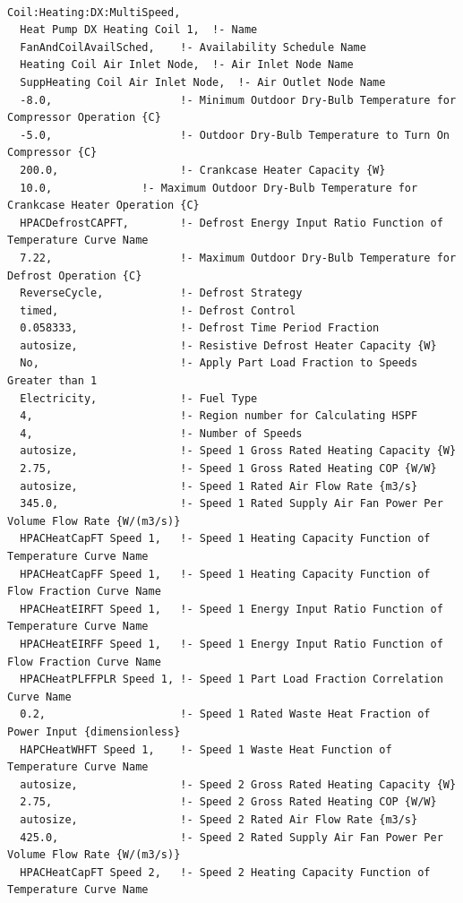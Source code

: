 \begin{lstlisting}

Coil:Heating:DX:MultiSpeed,
  Heat Pump DX Heating Coil 1,  !- Name
  FanAndCoilAvailSched,    !- Availability Schedule Name
  Heating Coil Air Inlet Node,  !- Air Inlet Node Name
  SuppHeating Coil Air Inlet Node,  !- Air Outlet Node Name
  -8.0,                    !- Minimum Outdoor Dry-Bulb Temperature for Compressor Operation {C}
  -5.0,                    !- Outdoor Dry-Bulb Temperature to Turn On Compressor {C}
  200.0,                   !- Crankcase Heater Capacity {W}
  10.0,              !- Maximum Outdoor Dry-Bulb Temperature for Crankcase Heater Operation {C}
  HPACDefrostCAPFT,        !- Defrost Energy Input Ratio Function of Temperature Curve Name
  7.22,                    !- Maximum Outdoor Dry-Bulb Temperature for Defrost Operation {C}
  ReverseCycle,            !- Defrost Strategy
  timed,                   !- Defrost Control
  0.058333,                !- Defrost Time Period Fraction
  autosize,                !- Resistive Defrost Heater Capacity {W}
  No,                      !- Apply Part Load Fraction to Speeds Greater than 1
  Electricity,             !- Fuel Type
  4,                       !- Region number for Calculating HSPF
  4,                       !- Number of Speeds
  autosize,                !- Speed 1 Gross Rated Heating Capacity {W}
  2.75,                    !- Speed 1 Gross Rated Heating COP {W/W}
  autosize,                !- Speed 1 Rated Air Flow Rate {m3/s}
  345.0,                   !- Speed 1 Rated Supply Air Fan Power Per Volume Flow Rate {W/(m3/s)}
  HPACHeatCapFT Speed 1,   !- Speed 1 Heating Capacity Function of Temperature Curve Name
  HPACHeatCapFF Speed 1,   !- Speed 1 Heating Capacity Function of Flow Fraction Curve Name
  HPACHeatEIRFT Speed 1,   !- Speed 1 Energy Input Ratio Function of Temperature Curve Name
  HPACHeatEIRFF Speed 1,   !- Speed 1 Energy Input Ratio Function of Flow Fraction Curve Name
  HPACHeatPLFFPLR Speed 1, !- Speed 1 Part Load Fraction Correlation Curve Name
  0.2,                     !- Speed 1 Rated Waste Heat Fraction of Power Input {dimensionless}
  HAPCHeatWHFT Speed 1,    !- Speed 1 Waste Heat Function of Temperature Curve Name
  autosize,                !- Speed 2 Gross Rated Heating Capacity {W}
  2.75,                    !- Speed 2 Gross Rated Heating COP {W/W}
  autosize,                !- Speed 2 Rated Air Flow Rate {m3/s}
  425.0,                   !- Speed 2 Rated Supply Air Fan Power Per Volume Flow Rate {W/(m3/s)}
  HPACHeatCapFT Speed 2,   !- Speed 2 Heating Capacity Function of Temperature Curve Name

\end{lstlisting}
